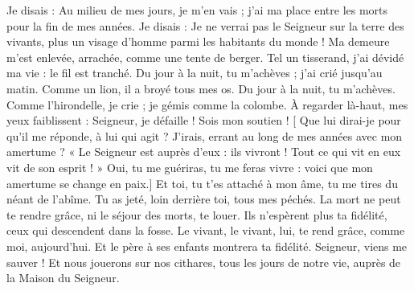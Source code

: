 Je disais : Au milieu de mes jours, je m’en vais ; j’ai ma place entre les morts pour la fin de mes années.
\versseparator
Je disais : Je ne verrai pas le Seigneur sur la terre des vivants, plus un visage d’homme parmi les habitants du monde !
\versseparator
Ma demeure m’est enlevée, arrachée, comme une tente de berger. Tel un tisserand, j’ai dévidé ma vie : le fil est tranché. Du jour à la nuit, tu m’achèves ;
\versseparator
j’ai crié jusqu’au matin. Comme un lion, il a broyé tous mes os. Du jour à la nuit, tu m’achèves.
\versseparator
Comme l’hirondelle, je crie ; je gémis comme la colombe. À regarder là-haut, mes yeux faiblissent : Seigneur, je défaille ! Sois mon soutien ! [
\versseparator
Que lui dirai-je pour qu’il me réponde, à lui qui agit ? J’irais, errant au long de mes années avec mon amertume ?
\versseparator
« Le Seigneur est auprès d’eux : ils vivront ! Tout ce qui vit en eux vit de son esprit ! » Oui, tu me guériras, tu me feras vivre :
\versseparator
voici que mon amertume se change en paix.] Et toi, tu t’es attaché à mon âme, tu me tires du néant de l’abîme. Tu as jeté, loin derrière toi, tous mes péchés.
\versseparator
La mort ne peut te rendre grâce, ni le séjour des morts, te louer. Ils n’espèrent plus ta fidélité, ceux qui descendent dans la fosse.
\versseparator
Le vivant, le vivant, lui, te rend grâce, comme moi, aujourd’hui. Et le père à ses enfants montrera ta fidélité.
\versseparator
Seigneur, viens me sauver ! Et nous jouerons sur nos cithares, tous les jours de notre vie, auprès de la Maison du Seigneur.
